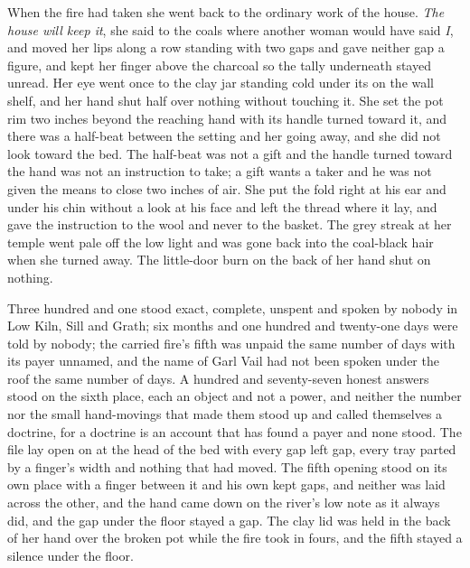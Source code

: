 When the fire had taken she went back to the ordinary work of the house. \emph{The house will keep it}, she said to the coals where another woman would have said \emph{I}, and moved her lips along a row standing with two gaps and gave neither gap a figure, and kept her finger above the charcoal so the tally underneath stayed unread. Her eye went once to the clay jar standing cold under its  on the wall shelf, and her hand shut half over nothing without touching it. She set the pot rim two inches beyond the reaching hand with its handle turned toward it, and there was a half-beat between the setting and her going away, and she did not look toward the bed. The half-beat was not a gift and the handle turned toward the hand was not an instruction to take; a gift wants a taker and he was not given the means to close two inches of air. She put the fold right at his ear and under his chin without a look at his face and left the thread where it lay, and gave the instruction to the wool and never to the basket. The grey streak at her temple went pale off the low light and was gone back into the coal-black hair when she turned away. The little-door burn on the back of her hand shut on nothing.

Three hundred and one stood exact, complete, unspent and spoken by nobody in Low Kiln, Sill and Grath; six months and one hundred and twenty-one days were told by nobody; the carried fire's fifth was unpaid the same number of days with its payer unnamed, and the name of Garl Vail had not been spoken under the roof the same number of days. A hundred and seventy-seven honest answers stood on the sixth place, each an object and not a power, and neither the number nor the small hand-movings that made them stood up and called themselves a doctrine, for a doctrine is an account that has found a payer and none stood. The file lay open on  at the head of the bed with every gap left gap, every tray parted by a finger's width and nothing that had moved. The fifth opening stood on its own place with a finger between it and his own kept gaps, and neither was laid across the other, and the hand came down on the river's low note as it always did, and the gap under the floor stayed a gap. The clay lid was held in the back of her hand over the broken pot while the fire took in fours, and the fifth stayed a silence under the floor.
